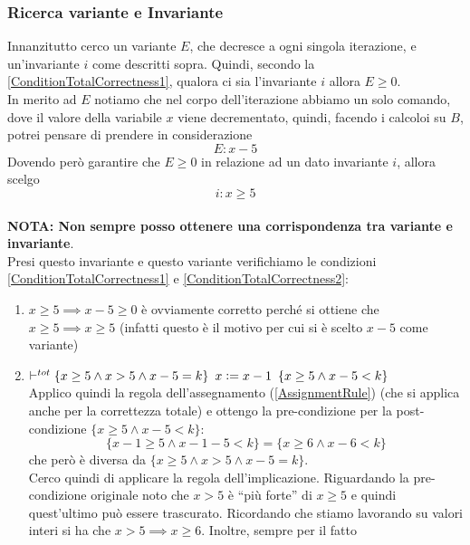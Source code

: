 \begin{esempio}
				      					\subsubsection{Ricerca variante e Invariante}
				      					Innanzitutto cerco un variante $E$, che decresce a ogni singola iterazione, e
				      					un'invariante $i$ come descritti sopra. Quindi, secondo la \ref{ConditionTotalCorrectness1}, qualora ci sia
				      					l'invariante $i$ allora  $E\geq 0$.\\
				      					In merito ad $E$ notiamo che nel corpo dell'iterazione abbiamo un solo	comando, dove il valore della variabile $x$ viene decrementato, quindi, facendo i calcoloi su $B$, potrei pensare di prendere in considerazione 
				      					\[E: x - 5\]
				      					Dovendo però garantire che $E\geq 0$ in relazione ad un dato invariante $i$, allora scelgo
				      					\[i: x \geq 5\] \\		\textbf{NOTA: Non sempre posso ottenere una corrispondenza tra variante e
				      						invariante}.\\
				      					Presi questo invariante e questo variante verifichiamo le condizioni \ref{ConditionTotalCorrectness1} e \ref{ConditionTotalCorrectness2}:
				      					\begin{enumerate}
				      						\item $x\geq 5\implies x-5\geq 0$ è ovviamente corretto perché si ottiene
				      						      che $x\geq 5\implies x \geq 5$ (infatti questo è il motivo per cui si è
				      						      scelto $x-5$ come variante)
				      						\item $\vdash^{tot}\{x\geq 5\land x>5\land x-5=k\}\,\,\, x\cceq
				      						      x-1\,\,\,\{x\geq 5\land x-5<k\}$\\
				      						      Applico quindi la regola dell'assegnamento (\ref{AssignmentRule}) (che si applica anche per la
				      						      correttezza totale) e ottengo la pre-condizione per la post-condizione
				      						      $\{x\geq 5\land x-5<k\}$:
				      						      \[\{x-1\geq 5\land x-1-5<k\}=\{x\geq 6\land x-6 < k\}\]
				      						      che però è diversa da $\{x\geq 5\land x>5\land x-5=k\}$.\\
				      						      Cerco quindi di applicare la regola dell'implicazione. Riguardando la
				      						      pre-condizione originale noto che $x>5$ è ``più forte'' di $x\geq 5$ e quindi
				      						      quest'ultimo può essere trascurato. Ricordando che stiamo lavorando su
				      						      valori interi si ha che $x>5\implies x\geq 6$. Inoltre, sempre per il fatto

\end{enumerate}
\end{esempio}
